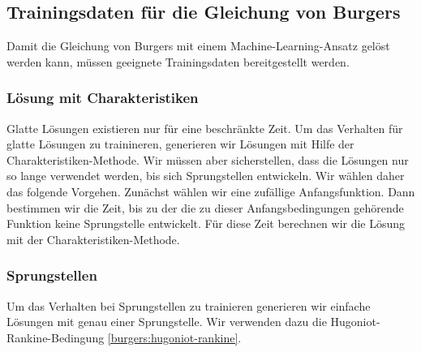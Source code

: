 %
%
%
\subsection{Trainingsdaten für die Gleichung von Burgers\label{burgers:training}}
Damit die Gleichung von Burgers mit einem Machine-Learning-Ansatz gelöst
werden kann, müssen geeignete Trainingsdaten bereitgestellt werden.


\subsubsection{Lösung mit Charakteristiken}
Glatte Lösungen existieren nur für eine beschränkte Zeit.
Um das Verhalten für glatte Lösungen zu trainineren, generieren
wir Lösungen mit Hilfe der Charakteristiken-Methode.
Wir müssen aber sicherstellen, dass die Lösungen nur so lange verwendet
werden, bis sich Sprungstellen entwickeln.
Wir wählen daher das folgende Vorgehen.
Zunächst wählen wir eine zufällige Anfangsfunktion.
Dann bestimmen wir die Zeit, bis zu der die zu dieser Anfangsbedingungen
gehörende Funktion keine Sprungstelle entwickelt.
Für diese Zeit berechnen wir die Lösung mit der Charakteristiken-Methode.

\subsubsection{Sprungstellen}
Um das Verhalten bei Sprungstellen zu trainieren generieren wir
einfache Lösungen mit genau einer Sprungstelle.
Wir verwenden dazu die Hugoniot-Rankine-Bedingung \eqref{burgers:hugoniot-rankine}.

